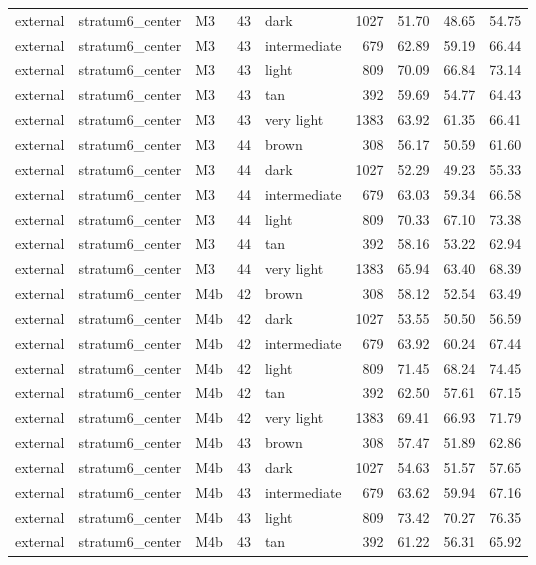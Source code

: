 \begin{tabular}{lllrlrrrr}
external & stratum6\_center & M3 & 43 & dark & 1027 & 51.70 & 48.65 & 54.75 \\
external & stratum6\_center & M3 & 43 & intermediate & 679 & 62.89 & 59.19 & 66.44 \\
external & stratum6\_center & M3 & 43 & light & 809 & 70.09 & 66.84 & 73.14 \\
external & stratum6\_center & M3 & 43 & tan & 392 & 59.69 & 54.77 & 64.43 \\
external & stratum6\_center & M3 & 43 & very light & 1383 & 63.92 & 61.35 & 66.41 \\
external & stratum6\_center & M3 & 44 & brown & 308 & 56.17 & 50.59 & 61.60 \\
external & stratum6\_center & M3 & 44 & dark & 1027 & 52.29 & 49.23 & 55.33 \\
external & stratum6\_center & M3 & 44 & intermediate & 679 & 63.03 & 59.34 & 66.58 \\
external & stratum6\_center & M3 & 44 & light & 809 & 70.33 & 67.10 & 73.38 \\
external & stratum6\_center & M3 & 44 & tan & 392 & 58.16 & 53.22 & 62.94 \\
external & stratum6\_center & M3 & 44 & very light & 1383 & 65.94 & 63.40 & 68.39 \\
external & stratum6\_center & M4b & 42 & brown & 308 & 58.12 & 52.54 & 63.49 \\
external & stratum6\_center & M4b & 42 & dark & 1027 & 53.55 & 50.50 & 56.59 \\
external & stratum6\_center & M4b & 42 & intermediate & 679 & 63.92 & 60.24 & 67.44 \\
external & stratum6\_center & M4b & 42 & light & 809 & 71.45 & 68.24 & 74.45 \\
external & stratum6\_center & M4b & 42 & tan & 392 & 62.50 & 57.61 & 67.15 \\
external & stratum6\_center & M4b & 42 & very light & 1383 & 69.41 & 66.93 & 71.79 \\
external & stratum6\_center & M4b & 43 & brown & 308 & 57.47 & 51.89 & 62.86 \\
external & stratum6\_center & M4b & 43 & dark & 1027 & 54.63 & 51.57 & 57.65 \\
external & stratum6\_center & M4b & 43 & intermediate & 679 & 63.62 & 59.94 & 67.16 \\
external & stratum6\_center & M4b & 43 & light & 809 & 73.42 & 70.27 & 76.35 \\
external & stratum6\_center & M4b & 43 & tan & 392 & 61.22 & 56.31 & 65.92 \\

\end{tabular}
